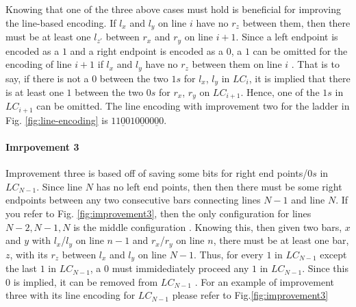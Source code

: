 Knowing that one of the three above cases must hold is beneficial for improving the 
line-based encoding. If $l_{x}$ and $l_{y}$ on line $i$ have no $r_{z}$ between them, 
then there must be at least one $l_{z\prime}$ between $r_{x}$ and $r_{y}$ on line $i+1$.
Since a left endpoint is encoded as a $1$ and a right endpoint is encoded as a $0$, 
a $1$ can be omitted for the encoding of line $i+1$ if $l_{x}$ and $l_{y}$ have no $r_{z}$
between them on line $i$ \cite{A5}. That is to say, if there is not a $0$ between 
the two  $1s$ for $l_{x}$, $l_{y}$ in $LC_{i}$, it is implied that there is at least one $1$ between 
the two $0s$ for $r_{x}$, $r_{y}$ on $LC_{i+1}$. Hence, one of the $1s$ in $LC_{i+1}$ can be omitted. 
The line encoding with improvement two for the ladder in Fig. \ref{fig:line-encoding} is $11\underline{0}010\underline{0}00\underline{0}0$.
\paragraph{Imrpovement 3}
Improvement three is based off of saving some bits for right 
end points/$0s$ in $LC_{N-1}$. Since line $N$ has no left end points,
then then there must be some right endpoints between any two 
consecutive bars connecting lines $N-1$ and line $N$. If you 
refer to Fig. \ref{fig:improvement3}, then the only configuration for lines $N-2, N-1, N$
is the middle configuration \cite{A5}. Knowing this, then 
given two bars, $x$ and $y$ with $l_{x}$/$l_{y}$ on line 
$n-1$ and $r_{x}$/$r_{y}$ on line $n$, there must be at least 
one bar, $z$, with its $r_{z}$ between $l_{x}$ and $l_{y}$
on line $N-1$. Thus, for every $1$ in $LC_{N-1}$ except the 
last $1$ in $LC_{N-1}$, a $0$ must immidediately proceed any $1$
in $LC_{N-1}$. Since this $0$ is implied, it can be removed from $LC_{N-1}$ \cite{A5}. 
For an example of improvement three with its line encoding for $LC_{N-1}$ please refer to Fig.\ref{fig:improvement3}\pagebreak
